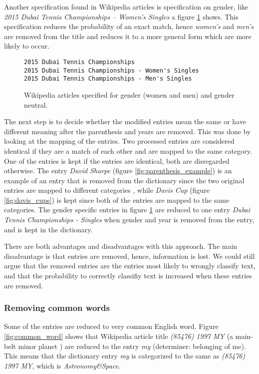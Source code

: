 Another specification found in Wikipedia articles is specification on gender, like \emph{2015 Dubai Tennis Championships – Women's Singles} a figure \ref{fig:dubai_gender} shows. This specification reduces the probability of an exact match, hence \emph{women's} and \emph{men's} are removed from the title and reduces it to a more general form which are more likely to occur. 

\begin{figure}[h]
\centering
\begin{lstlisting}
2015 Dubai Tennis Championships
2015 Dubai Tennis Championships - Women's Singles
2015 Dubai Tennis Championships - Men's Singles
\end{lstlisting}
\caption{Wikipedia articles specified for gender (women and men) and gender neutral.}
\label{fig:dubai_gender}
\end{figure}

The next step is to decide whether the modified entries mean the same or have different meaning after the parenthesis and years are removed. This was done by looking at the mapping of the entries. Two processed entries are considered identical if they are a match of each other and are mapped to the same category. One of the entries is kept if the entries are identical, both are disregarded otherwise. The entry \emph{David Sharpe} (figure \ref{fig:parenthesis_example}) is an example of an entry that is removed from the dictionary since the two original entries are mapped to different categories , while \emph{Davis Cup} (figure \ref{fig:davis_cups}) is kept since both of the entries are mapped to the same categories. The gender specific entries in figure \ref{fig:dubai_gender} are reduced to one entry \emph{Dubai Tennis Championships - Singles} when gender and year is removed from the entry, and is kept in the dictionary.

There are both advantages and disadvantages with this approach. The main disadvantage is that entries are removed, hence, information is lost. We could still argue that the removed entries are the entries most likely to wrongly classify text, and that the probability to correctly classifiy text is increased when these entries are removed. 


\subsubsection{Removing common words}
Some of the entries are reduced to very common English word. Figure \ref{fig:common_word} shows that Wikipedia article title \emph{(85476) 1997 MY} (a main-belt minor planet \cite{wiki:myplanet}) are reduced to the entry \emph{my} (determiner: belonging of me). This means that the dictionary entry \emph{my} is categorized to the same as \emph{(85476) 1997 MY}, which is \emph{Astronomy\&Space}.

